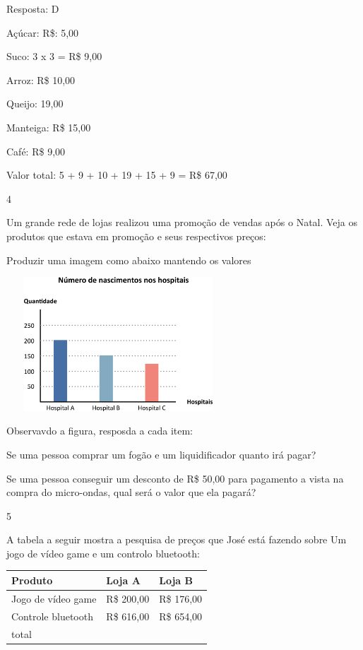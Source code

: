 Resposta: D

Açúcar: R\$: 5,00

Suco: 3 x 3 = R\$ 9,00

Arroz: R\$ 10,00

Queijo: 19,00

Manteiga: R\$ 15,00

Café: R\$ 9,00

Valor total: 5 + 9 + 10 + 19 + 15 + 9 = R\$ 67,00

\num{4}

Um grande rede de lojas realizou uma promoção de vendas após o Natal.
Veja os produtos que estava em promoção e seus respectivos preços:

Produzir uma imagem como abaixo mantendo os valores

\includegraphics[width=3.30029in,height=1.97517in]{media/image75.png}

Observavdo a figura, resposda a cada item:

\begin{escolha}

\item
  Se uma pessoa comprar um fogão e um liquidificador quanto irá pagar?

\item
  Se uma pessoa conseguir um desconto de R\$ 50,00 para pagamento a
  vista na compra do micro-ondas, qual será o valor que ela pagará?

\end{escolha}

\num{5}

A tabela a seguir mostra a pesquisa de preços que José está fazendo
sobre Um jogo de vídeo game e um controlo bluetooth:

\begin{longtable}[]{@{}lll@{}}
\toprule
Produto & Loja A & Loja B\tabularnewline
\midrule
\endhead
Jogo de vídeo game & R\$ 200,00 & R\$ 176,00\tabularnewline
Controle bluetooth & R\$ 616,00 & R\$ 654,00\tabularnewline
total & &\tabularnewline
\bottomrule
\end{longtable}

